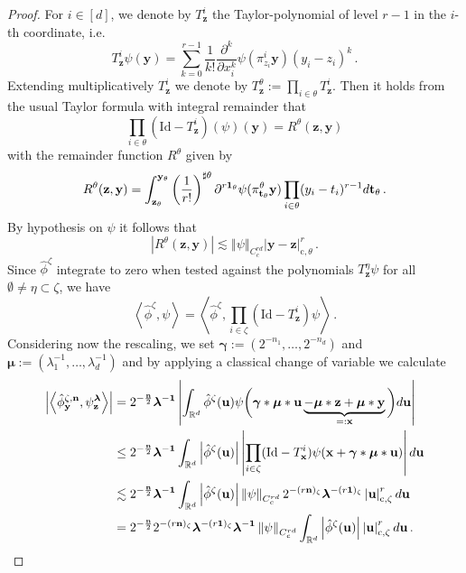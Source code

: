 \documentclass[12pt]{article}
\numberwithin{equation}{section}
\theoremstyle{plain}
\theoremstyle{definition}
\newcommand{\abs}[1]{\left\vert #1 \right\vert}
\newcommand{\scalar}[1]{\left\langle #1 \right\rangle}
\newcommand{\norm}[1]{\left\Vert #1\right\Vert}
\newcommand{\R}{\ensuremath{{\mathbb R}}}
\newcommand{\Id}{\mbox{Id}}
\def\bR{\mathbb{R}}\def\bS{\mathbb{S}}
\def\fu{\mathbf u}\def\fv{\mathbf v}
\def\fy{\mathbf y}\def\fz{\mathbf z}
\def\fgamma{{\boldsymbol\gamma}}
\def\flambda{{\boldsymbol\lambda}}
\def\fmu{{\boldsymbol\mu}}
\def\fone{{\boldsymbol 1}}
\begin{document}
\begin{proof}
    For $i\in[d]$, we denote by $T^i_{\mathbf{z}}$ the Taylor-polynomial of level $r-1$ in the $i$-th coordinate, i.e.
%
    \begin{equation*}
        T^i_{\mathbf{z}}\psi(\fy) = \sum_{k=0}^{r-1} \frac 1{k!}\frac{\partial^k}{\partial x_i^k} \psi(\pi_{z_i}^i \fy)(y_i-z_i)^k\,.
    \end{equation*}
   Extending multiplicatively $T^i_{\mathbf{z}}$  we denote by $T^\theta_{\fz} := \prod_{i\in\theta} T^i_{\mathbf{z}}$. Then it holds from the usual Taylor formula with integral remainder that
    \begin{equation*}
        \prod_{i\in\theta}(\Id - T^i_{\mathbf{z}})(\psi)(\fy) = R^\theta(\fz,\fy)
    \end{equation*}
    with the remainder  function $R^{\theta}$ given  by
    \begin{equation*}
        R^\theta(\fz,\fy) = \int_{\fz_\theta}^{\fy_\theta}\left(\frac 1{r!}\right)^{\sharp\theta}\partial^{r\mathbf{1}_\theta}\psi(\pi^\theta_{\ft_\theta}\fy)\prod_{i\in\theta}(y_i-t_i)^{r-1}d\ft_\theta\,.
    \end{equation*}
    By hypothesis on $\psi $ it follows that
    \begin{equation*}
        \abs{R^\theta(\fz,\fy)}\lesssim \norm{\psi}_{C_c^{rd}}\abs{\fy-\fz}^{r}_{\text{c},\theta}\,.
    \end{equation*}
   Since  $\hat{\phi}^\zeta$ integrate 
 to zero when tested against the polynomials $T^\eta_{\fz}\psi$ for  all $\emptyset\neq\eta\subset\zeta$, we have 
   \[\scalar{\hat{\phi}^\zeta,\psi}= \scalar{\hat{\phi}^\zeta,\prod_{i\in\zeta}(\Id-T^i_{\fz})\psi}\,.\]
   Considering now the rescaling, we set $\fgamma := (2^{-n_1},\dots,2^{-n_d})$ and $\fmu := (\lambda_1^{-1},\dots,\lambda_d^{-1})$ and by applying a classical change of variable we calculate
    \begin{align*}
    \abs{\scalar{\hat\phi^{\zeta,\fn}_{\fy},\psi^{\flambda}_{\fz}}} &=2^{-\frac{\fn}{2}} \flambda^{-\fone}\abs{\int_{\R^d}\hat\phi^\zeta(\fu) \psi\bigg(\fgamma*\fmu*\fu\underbrace{-\fmu*\fz+\fmu*\fy}_{=:\fx}\bigg)d\fu}\\ 
    &\le 2^{-\frac{\fn}{2}} \flambda^{-\fone}\int_{\bR^d}\abs{\hat\phi^\zeta(\fu)}\abs{\prod_{i\in\zeta}(\Id-T^i_{\fx})\psi(\fx+\fgamma*\fmu*\fu)}d\fu\\&\lesssim 2^{-\frac{\fn}{2}} \flambda^{-\fone}\int_{\bR^d} \abs{\hat\phi^\zeta(\fu)}\norm{\psi}_{C_c^{rd}}2^{-(r\fn)_{\zeta}}\flambda^{-(r\mathbf{1})_\zeta}\abs{\fu}^{r}_{\text{c},\zeta}d\fu\\
        &= 2^{-\frac{\fn}{2}} 2^{-(r\fn)_{\zeta}}\flambda^{-(r\mathbf{1})_\zeta}\flambda^{-\fone}\norm{\psi}_{C_c^{rd}}\int_{\bR^d}\abs{\hat\phi^\zeta(\fu)}\abs{\fu}^{r}_{\text{c},\zeta}d\fu\,.
    \end{align*}
\end{proof}
\end{document}
